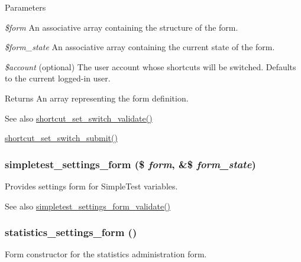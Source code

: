 \begin{DoxyParams}{Parameters}
\item[{\em \$form}]An associative array containing the structure of the form. \item[{\em \$form\_\-state}]An associative array containing the current state of the form. \item[{\em \$account}](optional) The user account whose shortcuts will be switched. Defaults to the current logged-\/in user.\end{DoxyParams}
\begin{DoxyReturn}{Returns}
An array representing the form definition.
\end{DoxyReturn}
\begin{DoxySeeAlso}{See also}
\hyperlink{shortcut_8admin_8inc_ad9a4a7bd86add86452fdae0d123704a5}{shortcut\_\-set\_\-switch\_\-validate()} 

\hyperlink{shortcut_8admin_8inc_a0fbc329e8a567e9364a54e57ce31ee04}{shortcut\_\-set\_\-switch\_\-submit()} 
\end{DoxySeeAlso}
\hypertarget{group__forms_gaf74d9bfea1d65a5435e45a36084d10df}{
\subsubsection[{simpletest\_\-settings\_\-form}]{\setlength{\rightskip}{0pt plus 5cm}simpletest\_\-settings\_\-form (\$ {\em form}, \/  \&\$ {\em form\_\-state})}}
\label{group__forms_gaf74d9bfea1d65a5435e45a36084d10df}
Provides settings form for SimpleTest variables.

\begin{DoxySeeAlso}{See also}
\hyperlink{simpletest_8pages_8inc_a6ecec99e6260d79bc3a8c0f861da4d9e}{simpletest\_\-settings\_\-form\_\-validate()} 
\end{DoxySeeAlso}
\hypertarget{group__forms_ga4b472705b18d63698ecd05ff23ef152b}{
\subsubsection[{statistics\_\-settings\_\-form}]{\setlength{\rightskip}{0pt plus 5cm}statistics\_\-settings\_\-form ()}}
\label{group__forms_ga4b472705b18d63698ecd05ff23ef152b}
Form constructor for the statistics administration form.

